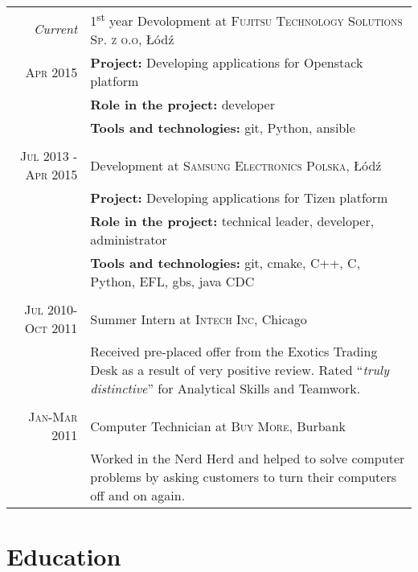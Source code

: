 \documentclass[a4paper,9pt]{article} %
\begin{document}
\begin{tabular}{r|p{11cm}}
\emph{Current} & 1\textsuperscript{st} year Devolopment at \textsc{Fujitsu Technology Solutions Sp. z o.o}, Łódź \\
\textsc{Apr 2015} & \textbf{Project:} Developing applications for Openstack platform\\
& \textbf{Role in the project:} developer\\
& \textbf{Tools and technologies:} git, Python, ansible\\
\multicolumn{2}{c}{} \\

\textsc{Jul 2013 - Apr 2015} & Development at \textsc{Samsung Electronics Polska}, Łódź \\
& \textbf{Project:} Developing applications for Tizen platform\\
& \textbf{Role in the project:} technical leader, developer, administrator\\
& \textbf{Tools and technologies:} git, cmake, C++, C, Python, EFL, gbs, java CDC\\
\multicolumn{2}{c}{} \\


\textsc{Jul 2010-Oct 2011} & Summer Intern at \textsc{Intech Inc}, Chicago \emph{}\\
& \footnotesize{Received pre-placed offer from the Exotics Trading Desk as a result of very positive review. Rated ``\emph{truly distinctive}'' for Analytical Skills and Teamwork.}\\
\multicolumn{2}{c}{} \\


\textsc{Jan-Mar 2011} & Computer Technician at \textsc{Buy More}, Burbank \emph{}\\
& \footnotesize{Worked in the Nerd Herd and helped to solve computer problems by asking customers to turn their computers off and on again.}
\end{tabular}


\section{Education}
\end{document}
